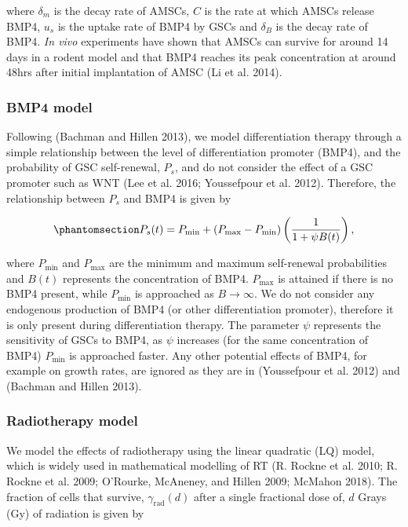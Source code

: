 \documentclass[
  default,
]{sn-jnl}
\begin{document}
where \(\delta_m\) is the decay rate of AMSCs, \(C\) is the rate at
which AMSCs release BMP4, \(u_s\) is the uptake rate of BMP4 by GSCs and
\(\delta_B\) is the decay rate of BMP4. \emph{In vivo} experiments have
shown that AMSCs can survive for around 14 days in a rodent model and
that BMP4 reaches its peak concentration at around 48hrs after initial
implantation of AMSC (Li et al. 2014).

\subsubsection{BMP4 model}\label{sec-BMP4-model}

Following (Bachman and Hillen 2013), we model differentiation therapy
through a simple relationship between the level of differentiation
promoter (BMP4), and the probability of GSC self-renewal, \(P_s\), and
do not consider the effect of a GSC promoter such as WNT (Lee et al.
2016; Youssefpour et al. 2012). Therefore, the relationship between
\(P_s\) and BMP4 is given by

\begin{equation}\phantomsection\label{eq-Ps}{
    P_s(t) = P_\text{min} + (P_\text{max} - P_\text{min})  \left( \frac{1}{1 +  \psi B(t)} \right),
}\end{equation}

where \(P_\text{min}\) and \(P_\text{max}\) are the minimum and maximum
self-renewal probabilities and \(B(t)\) represents the concentration of
BMP4. \(P_\text{max}\) is attained if there is no BMP4 present, while
\(P_\text{min}\) is approached as \(B \rightarrow \infty\). We do not
consider any endogenous production of BMP4 (or other differentiation
promoter), therefore it is only present during differentiation therapy.
The parameter \(\psi\) represents the sensitivity of GSCs to BMP4, as
\(\psi\) increases (for the same concentration of BMP4) \(P_\text{min}\)
is approached faster. Any other potential effects of BMP4, for example
on growth rates, are ignored as they are in (Youssefpour et al. 2012)
and (Bachman and Hillen 2013).

\subsubsection{Radiotherapy model}\label{sec-RT-model}

We model the effects of radiotherapy using the linear quadratic (LQ)
model, which is widely used in mathematical modelling of RT (R. Rockne
et al. 2010; R. Rockne et al. 2009; O'Rourke, McAneney, and Hillen 2009;
McMahon 2018). The fraction of cells that survive,
\(\gamma_{\text{rad}}(d)\) after a single fractional dose of, \(d\)
Grays (Gy) of radiation is given by
\end{document}
